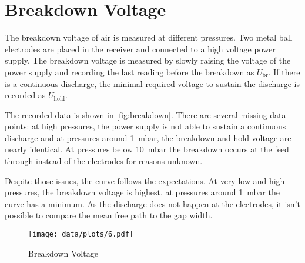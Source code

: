 \chapter{Breakdown Voltage}

The breakdown voltage of air is measured at different pressures.
Two metal ball electrodes are placed in the receiver and connected to a high voltage power supply.
The breakdown voltage is measured by slowly raising the voltage of the power supply and recording the last reading before the breakdown as $U_\text{br}$.
If there is a continuous discharge, the minimal required voltage to sustain the discharge is recorded as $U_\text{hold}$.

The recorded data is shown in \autoref{fig:breakdown}.
There are several missing data points: at high pressures, the power supply is not able to sustain a continuous discharge and at pressures around \SI{1}{\milli\bar}, the breakdown and hold voltage are nearly identical.
At pressures below \SI{10}{\milli\bar} the breakdown occurs at the feed through instead of the electrodes for reasons unknown.

Despite those issues, the curve follows the expectations.
At very low and high pressures, the breakdown voltage is highest, at pressures around \SI{1}{\milli\bar} the curve has a minimum.
As the discharge does not happen at the electrodes, it isn't possible to compare the mean free path to the gap width.

\begin{figure}[b!]
	\centering
	\texttt{[image: data/plots/6.pdf]}
	\caption{Breakdown Voltage}
	\label{fig:breakdown}
\end{figure}
